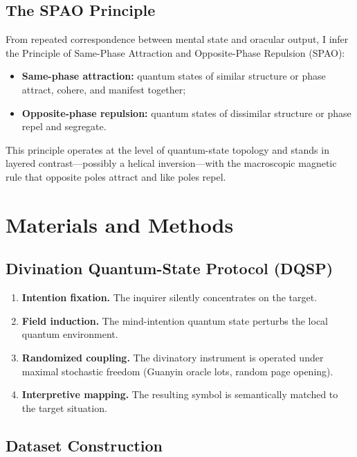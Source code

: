 \documentclass[11pt,a4paper]{article}
\begin{document}
\subsection{The SPAO Principle}

From repeated correspondence between mental state and oracular output, I infer the Principle of Same-Phase Attraction and Opposite-Phase Repulsion (SPAO):

\begin{itemize}
  \item \textbf{Same-phase attraction:} quantum states of similar structure or phase attract, cohere, and manifest together;
  \item \textbf{Opposite-phase repulsion:} quantum states of dissimilar structure or phase repel and segregate.
\end{itemize}

This principle operates at the level of quantum-state topology and stands in layered contrast---possibly a helical inversion---with the macroscopic magnetic rule that opposite poles attract and like poles repel.


\section{Materials and Methods}

\subsection{Divination Quantum-State Protocol (DQSP)}

\begin{enumerate}
  \item \textbf{Intention fixation.} The inquirer silently concentrates on the target.
  \item \textbf{Field induction.} The mind-intention quantum state perturbs the local quantum environment.
  \item \textbf{Randomized coupling.} The divinatory instrument is operated under maximal stochastic freedom (Guanyin oracle lots, random page opening).
  \item \textbf{Interpretive mapping.} The resulting symbol is semantically matched to the target situation.
\end{enumerate}

\subsection{Dataset Construction}
\end{document}
